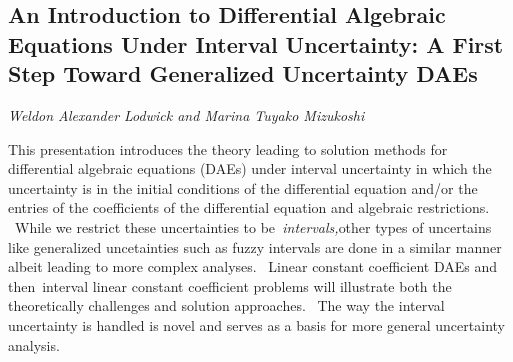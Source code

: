 \documentclass[../booklet.tex]{subfiles}
\begin{document}
\subsection[An Introduction to Differential Algebraic Equations Under Interval Uncertainty: A First Step Toward Generalized Uncertainty DAEs. {\it Weldon Alexander Lodwick and Marina Tuyako Mizukoshi}]{An Introduction to Differential Algebraic Equations Under Interval Uncertainty: A First Step Toward Generalized Uncertainty DAEs}
 

\begin{center}
  {\it Weldon Alexander Lodwick and Marina Tuyako Mizukoshi}
\end{center}

\vskip 0.8cm


This presentation introduces the theory leading to solution methods for
differential algebraic equations (DAEs) under interval uncertainty in which
the uncertainty is in the initial conditions of the differential equation
and/or the entries of the coefficients of the differential equation and
algebraic restrictions. \ While we restrict these uncertainties to
be\textit{\ intervals,}other types of uncertains like generalized uncetainties
such as fuzzy intervals are done in a similar manner albeit leading to more
complex analyses. \ Linear constant coefficient DAEs and then\ interval linear
constant coefficient problems will illustrate both the theoretically
challenges and solution approaches. \ The way the interval uncertainty is
handled is novel and serves as a basis for more general uncertainty analysis.
\end{document}
